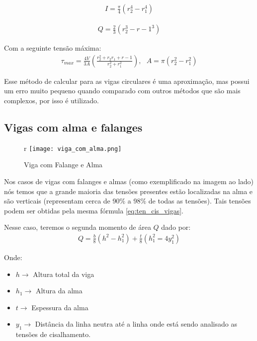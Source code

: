 \documentclass{article}
\begin{document}
\begin{minipage}{0.45\textwidth}
    \begin{align}
        I = \frac{\pi}{4} (r_2^4 - r_1^4)
    \end{align}
\end{minipage}
\begin{minipage}{0.45\textwidth}
    \begin{align}
        Q = \frac{2}{3}(r_2^3 - r-1^3)
    \end{align}
\end{minipage}

\vspace{10px}
Com a seguinte tensão máxima:
\begin{align}
    \tau_{max} = \frac{4V}{3A}\left(\frac{r_2^2 + r_2r_1 + r-1}{r_2^2 + r_1^2}\right), \ \ \ A = \pi(r_2^2 - r_1^2)
\end{align}

Esse método de calcular para as vigas circulares é uma aproximação, mas possui um erro muito pequeno quando comparado com outros métodos que são mais complexos, por isso é utilizado.

\newpage
\subsection{Vigas com alma e falanges}
\begin{figure}[13]{r}
    \centering
    \texttt{[image: viga\_com\_alma.png]}
    \caption{Viga com Falange e Alma}
    \label{fig:viga_com_alma}
\end{figure}
Nos casos de vigas com falanges e almas (como exemplificado na imagem ao lado) nós temos que a grande maioria das tensões presentes estão localizadas na alma e são verticais (representam cerca de 90$\%$ a 98$\%$ de todas as tensões).
Tais tensões podem ser obtidas pela mesma fórmula \ref{eq:ten_cis_vigas}.

Nesse caso, teremos o segunda momento de área $Q$ dado por:
\begin{align}
    Q = \frac{b}{8}(h^2 - h_1^2) + \frac{t}{8}(h_1^2 = 4y_1^2)
\end{align}

Onde:
\begin{itemize}
    \item $h \rightarrow$ Altura total da viga
    \item $h_1 \rightarrow$ Altura da alma
    \item $t \rightarrow$ Espessura da alma
    \item $y_1 \rightarrow$ Distância da linha neutra até a linha onde está sendo analisado as tensões de cisalhamento.
\end{itemize}
\end{document}
